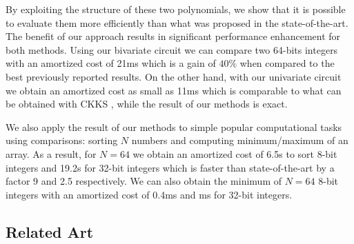 By exploiting the structure of these two polynomials, we show that it is possible to evaluate them more efficiently than what was proposed in the state-of-the-art. The benefit of our approach results in significant performance enhancement for both methods. Using our bivariate circuit we can compare two 64-bits integers with an amortized cost of 21ms which is a gain of $40\%$ when compared to the best previously reported results. On the other hand, with our univariate circuit we obtain an amortized cost as small as 11ms which is comparable to what can be obtained with CKKS , while the result of our methods is exact. 

We also apply the result of our methods to simple popular computational tasks using comparisons: sorting $N$ numbers and computing minimum/maximum of an array. As a result, for $N=64$ we obtain an amortized cost of 6.5s to sort 8-bit integers and 19.2s for 32-bit integers which is faster than state-of-the-art by a factor 9 and 2.5 respectively. We can also obtain the minimum of $N=64$ 8-bit integers with an amortized cost of 0.4ms and ms for 32-bit integers.

\subsection{Related Art}
\label{sec:related-art}





